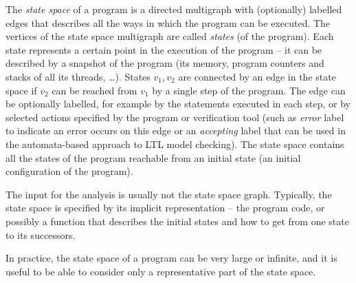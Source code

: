\begin{definition}
The \emph{state space} of a program is a directed multigraph with (optionally) labelled edges that describes all the ways in which the program can be executed.
The vertices of the state space multigraph are called \emph{states} (of the program).
Each state represents a certain point in the execution of the program -- it can be described by a snapshot of the program (its memory, program counters and stacks of all its threads, …).
States $v_1, v_2$ are connected by an edge in the state space if $v_2$ can be reached from $v_1$ by a single step of the program.
The edge can be optionally labelled, for example by the statements executed in each step, or by selected actions specified by the program or verification tool (such as \emph{error} label to indicate an error occurs on this edge or an \emph{accepting} label that can be used in the automata-based approach to LTL model checking).
The state space contains all the states of the program reachable from an initial state (an initial configuration of the program).
\end{definition}

The input for the analysis is usually not the state space graph.
Typically, the state space is specified by its implicit representation -- the program code, or possibly a function that describes the initial states and how to get from one state to its successors.

In practice, the state space of a program can be very large or infinite, and it
is useful to be able to consider only a representative part of the state space.

